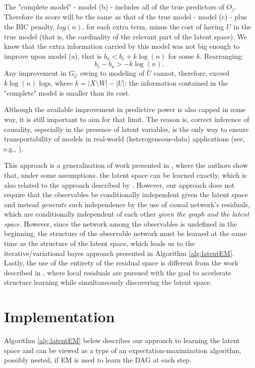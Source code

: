 \documentclass{article}
\begin{document}
The "complete model" - model (b) - includes all of the true predictors of $O_j$.  Therefore its score will be the same as that of the true model - model (c) - plus the BIC penalty, $log(n)$, for each extra term, minus the cost of having $U$ in the true model (that is, the cardinality of the relevant part of the latent space).  We know that the extra information carried by this model was not big enough to improve upon model (a), that is $b_a < b_c + k \log(n)$ for some $k$.  Rearranging:
\begin{equation}
    b_c - b_a > -k\log(n).
    \label{eq:ceilingTheorem}
\end{equation}
Any improvement in $G_{\bar{U}}$ owing to modeling of $\bar{U}$ cannot, therefore, exceed $k\log(n)$ logs, where $k = |X \setminus W| - |U|$: the information contained in the "complete" model is smaller than its cost.

Although the available improvement in predictive power is also capped in some way, it is still important to aim for that limit.  The reason is, correct inference of causality, especially in the presence of latent variables, is the only way to ensure transportability of models in real-world (heterogeneous-data) applications (see, e.g., \cite{bareinboim_causal_2016}).

This approach is a generalization of work presented in \cite{anandkumar_learning_2013}, where the authors show that, under some assumptions. the latent space can be learned exactly, which is also related to the approach described by \cite{wang_deconfounder_2019}.  However, our approach does not require that the observables be conditionally independent given the latent space and instead \textit{generate} such independence by the use of causal network's residuals, which are conditionally independent of each other \textit{given the graph and the latent space}.  However, since the network among the observables is undefined in the beginning, the structure of the observable network must be learned at the same time as the structure of the latent space, which leads us to the iterative/variational bayes approach presented in Algorithm \ref{alg:latentEM}.  Lastly, the use of the entirety of the residual space is different from the work described in \cite{elidan_ideal_2007}, where local residuals are pursued with the goal to accelerate structure learning while simultaneously discovering the latent space.

\section{Implementation}
Algorithm \ref{alg:latentEM} below describes our approach to learning the latent space and can be viewed as a type of an expectation-maximization algorithm, possibly nested, if EM is used to learn the DAG at each step.
\end{document}

